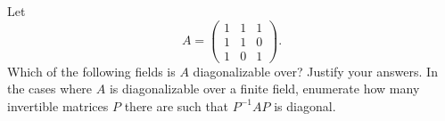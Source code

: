 \documentclass[answers]{exam}
\begin{document}
\begin{questions}



\question%
Let \[
	A=\begin{pmatrix}
		1 & 1 & 1 \\
		1 & 1 & 0 \\
		1 & 0 & 1
	\end{pmatrix}.
\] Which of the following fields is $A$ diagonalizable over? Justify your answers. In the cases where $A$ is diagonalizable over a finite field, enumerate how many invertible matrices $P$ there are such that $P^{-1} A P$ is diagonal.

\end{questions}
\end{document}
